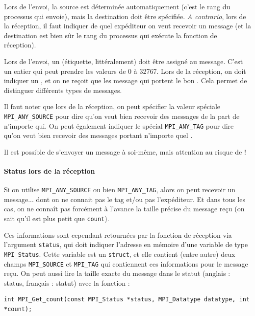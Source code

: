 Lors de l'envoi, la source est déterminée automatiquement (c'est le rang du
processus qui envoie), mais la destination doit être spécifiée. \textit{A
  contrario}, lors de la réception, il faut indiquer de quel expéditeur on veut
recevoir un message (et la destination est bien sûr le rang du processus qui
exécute la fonction de réception).

Lors de l'envoi, un \og {}\fg (\og étiquette\fg,
littéralement) doit être assigné au message. C'est un entier qui peut
prendre les valeurs de 0 à 32767. Lors de la réception, on doit
indiquer un , et on ne reçoit que les message qui portent
le bon . Cela permet de distinguer différents types de
messages.

Il faut noter que lors de la réception, on peut spécifier la valeur
spéciale \texttt{MPI\_ANY\_SOURCE} pour dire qu'on veut bien recevoir
des messages de la part de n'importe qui. On peut également indiquer
le  spécial \texttt{MPI\_ANY\_TAG} pour dire qu'on veut
bien recevoir des messages portant n'importe quel .

Il est possible de s'envoyer un message à soi-même, mais attention au
risque de  !

\paragraph{Status lors de la réception} Si on utilise \texttt{MPI\_ANY\_SOURCE}
ou bien \texttt{MPI\_ANY\_TAG}, alors on peut recevoir un message... dont on ne
connait pas le tag et/ou pas l'expéditeur. Et dans tous les cas, on ne connaît
pas forcément à l'avance la taille précise du message reçu (on sait qu'il est
plus petit que \verb|count|).

Ces informations sont cependant retournées par la fonction de réception via
l'argument \texttt{status}, qui doit indiquer l'adresse en mémoire d'une
variable de type \texttt{MPI\_Status}. Cette variable est un \texttt{struct}, et
elle contient (entre autre) deux champs \texttt{MPI\_SOURCE} et
\texttt{MPI\_TAG} qui contiennent ces informations pour le message reçu. On peut
aussi lire la taille exacte du message dans le statut (anglais : \og status\fg,
français : \og statut\fg) avec la fonction :

\begin{verbatim}
int MPI_Get_count(const MPI_Status *status, MPI_Datatype datatype, int *count);
\end{verbatim}

